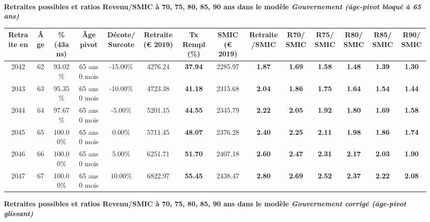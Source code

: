  ~\\{\bf \noindent Retraites possibles et ratios Revenu/SMIC à 70, 75, 80, 85, 90 ans dans le modèle \emph{Gouvernement (âge-pivot bloqué à 65 ans)}}  
 
\begin{adjustbox}{max width=\textwidth} 
\begin{tabular}[htb]{|c|c||c|c|c||c|c||c|c||c|c|c|c|c|} 
\hline 
 Retraite en &  Âge &  \%(43ans) &  Âge pivot &  Décote/Surcote &  Retraite (\euro{} 2019) &  Tx Rempl(\%) &  SMIC (\euro{} 2019) &  Retraite/SMIC &  R70/SMIC &  R75/SMIC &  R80/SMIC &  R85/SMIC &  R90/SMIC \\ 
\hline \hline 
 2042 &  62 &  93.02\% &  65 ans 0 mois &  -15.00\% &  4276.24 &  {\bf 37.94} &  2285.97 &  {\bf 1.87} &  {\bf 1.69} &  {\bf 1.58} &  {\bf 1.48} &  {\bf 1.39} &  {\bf 1.30} \\ 
\hline 
 2043 &  63 &  95.35\% &  65 ans 0 mois &  -10.00\% &  4723.38 &  {\bf 41.18} &  2315.68 &  {\bf 2.04} &  {\bf 1.86} &  {\bf 1.75} &  {\bf 1.64} &  {\bf 1.54} &  {\bf 1.44} \\ 
\hline 
 2044 &  64 &  97.67\% &  65 ans 0 mois &  -5.00\% &  5201.15 &  {\bf 44.55} &  2345.79 &  {\bf 2.22} &  {\bf 2.05} &  {\bf 1.92} &  {\bf 1.80} &  {\bf 1.69} &  {\bf 1.58} \\ 
\hline 
 2045 &  65 &  100.00\% &  65 ans 0 mois &  0.00\% &  5711.45 &  {\bf 48.07} &  2376.28 &  {\bf 2.40} &  {\bf 2.25} &  {\bf 2.11} &  {\bf 1.98} &  {\bf 1.86} &  {\bf 1.74} \\ 
\hline 
 2046 &  66 &  100.00\% &  65 ans 0 mois &  5.00\% &  6251.71 &  {\bf 51.70} &  2407.18 &  {\bf 2.60} &  {\bf 2.47} &  {\bf 2.31} &  {\bf 2.17} &  {\bf 2.03} &  {\bf 1.90} \\ 
\hline 
 2047 &  67 &  100.00\% &  65 ans 0 mois &  10.00\% &  6822.97 &  {\bf 55.45} &  2438.47 &  {\bf 2.80} &  {\bf 2.69} &  {\bf 2.52} &  {\bf 2.37} &  {\bf 2.22} &  {\bf 2.08} \\ 
\hline 
\hline 
\end{tabular} 
\end{adjustbox} 
 
 \vspace{0.1cm} 
{\bf \noindent Retraites possibles et ratios Revenu/SMIC à 70, 75, 80, 85, 90 ans dans le modèle \emph{Gouvernement corrigé (âge-pivot glissant)}}  
 

